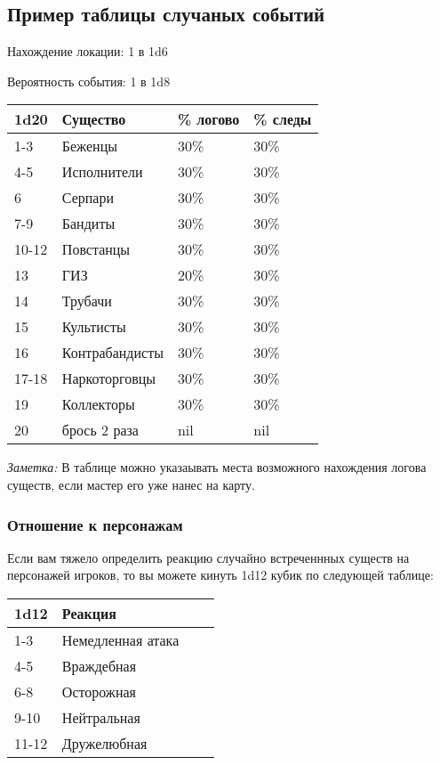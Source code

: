 \subsection*{Пример таблицы случаных событий}

Нахождение локации: 1 в 1d6

Вероятность события: 1 в 1d8

\begin{table}[H]
  \centering
  \begin{tabular}{*4{l}}
    \toprule
    1d20 & Существо & \% логово & \% следы \\
    \midrule
    1-3   & Беженцы        & 30\% & 30\% \\
    4-5   & Исполнители    & 30\% & 30\% \\
    6     & Серпари        & 30\% & 30\% \\
    7-9   & Бандиты        & 30\% & 30\% \\
    10-12 & Повстанцы      & 30\% & 30\% \\
    13    & ГИЗ            & 20\% & 30\% \\
    14    & Трубачи        & 30\% & 30\% \\
    15    & Культисты      & 30\% & 30\% \\
    16    & Контрабандисты & 30\% & 30\% \\
    17-18 & Наркоторговцы  & 30\% & 30\% \\
    19    & Коллекторы     & 30\% & 30\% \\
    20    & брось 2 раза   & nil & nil \\
    \bottomrule
  \end{tabular}
\end{table}

\textit{Заметка:} В таблице можно указаывать места возможного нахождения логова существ,
если мастер его уже нанес на карту.

\subsubsection*{Отношение к персонажам}

Если вам тяжело определить реакцию случайно встреченнных существ
на персонажей игроков, то вы можете кинуть 1d12 кубик по следующей таблице:

\begin{table}[H]
  \centering
  \begin{tabular}{*4{l}}
    \toprule
    1d12 & Реакция \\
    \midrule
    1-3   & Немедленная атака\\
    4-5   & Враждебная\\
    6-8   & Осторожная\\
    9-10  & Нейтральная\\
    11-12 & Дружелюбная\\
    \bottomrule
  \end{tabular}
\end{table}